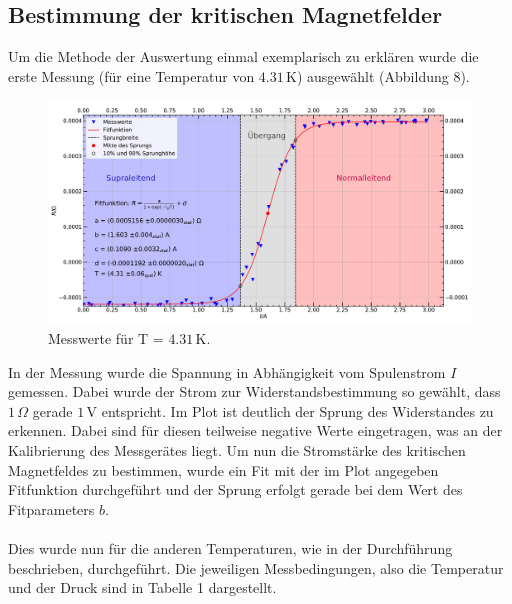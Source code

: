 \documentclass[german,  %
parskip=full,  %
]{scrartcl}
\begin{document}
\subsection{Bestimmung der kritischen Magnetfelder}
Um die Methode der Auswertung einmal exemplarisch zu erklären wurde die erste Messung (für eine Temperatur von $4.31$\,K) ausgewählt (Abbildung 8).
\newpage
\begin{figure}[h!]
\centering
\includegraphics[width=\textwidth]{Fitverfahren}
\caption{Messwerte für T = $4.31$\,K.}
\end{figure}
In der Messung wurde die Spannung in Abhängigkeit vom Spulenstrom $I$ gemessen. Dabei wurde der Strom zur Widerstandsbestimmung so gewählt, dass $1\, \Omega$ gerade $1$\,V entspricht. Im Plot ist deutlich der Sprung des Widerstandes zu erkennen. Dabei sind für diesen teilweise negative Werte eingetragen, was an der Kalibrierung des Messgerätes liegt. Um nun die Stromstärke des kritischen Magnetfeldes zu bestimmen, wurde ein Fit mit der im Plot angegeben Fitfunktion durchgeführt und der Sprung erfolgt gerade bei dem Wert des Fitparameters $b$. 
\\\\
Dies wurde nun für die anderen Temperaturen, wie in der Durchführung beschrieben, durchgeführt.
Die jeweiligen Messbedingungen, also die Temperatur und der Druck sind in Tabelle 1 dargestellt.
\newpage
\end{document}
